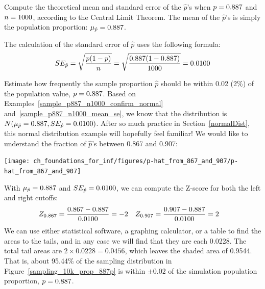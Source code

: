 \begin{examplewrap}
\begin{nexample}{Compute the theoretical mean and standard error
of the $\hat{p}$'s when
$p = 0.887{}$ and $n = 1000{}$,
according to the
Central Limit Theorem.}\label{sample_p887_n1000_mean_se}
The mean of the $\hat{p}$'s is simply the population proportion:
$\mu_{\hat{p}} = 0.887{}$.

The calculation of the standard error of $\hat{p}$ uses
the following formula:
\begin{align*}
SE_{\hat{p}}
    = \sqrt{\frac{p (1 - p)}{n}}
    = \sqrt{\frac{0.887{} (1 - 0.887{})}{1000}}
    = 0.0100{}
\end{align*}
\end{nexample}
\end{examplewrap}

\begin{examplewrap}
\begin{nexample}{Estimate how frequently the sample proportion
$\hat{p}$ should be within 0.02 (2\%) of the population value,
$p = 0.887{}$. Based on
Examples~\ref{sample_p887_n1000_confirm_normal}
and~\ref{sample_p887_n1000_mean_se}, we know that the distribution is
$N(\mu_{\hat{p}} = 0.887{}, SE_{\hat{p}} = 0.0100{})$.}
\label{sampling_10k_prop_887p-prop_from_867_to_907}
After so much practice in Section~\ref{normalDist},
this normal distribution example will hopefully feel familiar!
We would like to understand the fraction of $\hat{p}$'s
between 0.867 and 0.907:
\begin{center}
\texttt{[image: ch\_foundations\_for\_inf/figures/p-hat\_from\_867\_and\_907/p-hat\_from\_867\_and\_907]}
\end{center}
With $\mu_{\hat{p}} = 0.887{}$ and
$SE_{\hat{p}} = 0.0100{}$,
we can compute the Z-score for both the left and right cutoffs:
\begin{align*}
Z_{0.867} &= \frac{0.867 - 0.887{}}{0.0100{}} = -2
&Z_{0.907} &= \frac{0.907 - 0.887{}}{0.0100{}} = 2
\end{align*}
We can use either statistical software, a graphing calculator,
or a table to find the areas to the tails, and in any case we
will find that they are each 0.0228. The total tail areas are
$2 \times 0.0228 = 0.0456$, which leaves the shaded area of
0.9544. That is, about 95.44\% of the sampling distribution
in Figure~\ref{sampling_10k_prop_887p} is within $\pm0.02$
of the simulation population proportion, $p = 0.887{}$.
\end{nexample}
\end{examplewrap}

